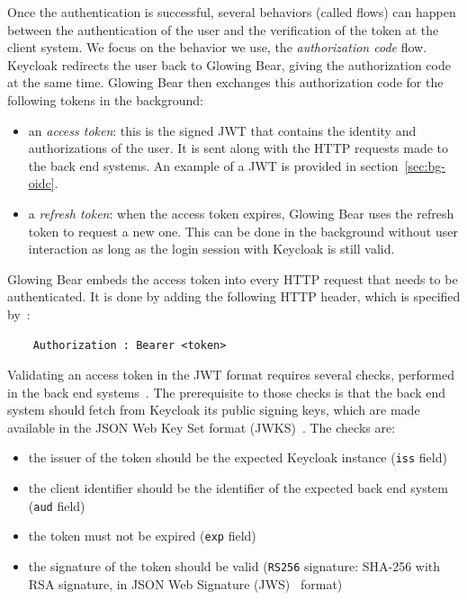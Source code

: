 Once the authentication is successful, several behaviors (called flows) can happen between the authentication of the user and the verification of the token at the client system.
We focus on the behavior we use, the \emph{authorization code} flow.
Keycloak redirects the user back to Glowing Bear, giving the authorization code at the same time.
Glowing Bear then exchanges this authorization code for the following tokens in the background:

\begin{itemize}
    \item an \emph{access token}: this is the signed JWT that contains the identity and authorizations of the user. It is sent along with the HTTP requests made to the back end systems. An example of a JWT is provided in section~\ref{sec:bg-oidc}.
    \item a \emph{refresh token}: when the access token expires, Glowing Bear uses the refresh token to request a new one. This can be done in the background without user interaction as long as the login session with Keycloak is still valid.
\end{itemize}

Glowing Bear embeds the access token into every HTTP request that needs to be authenticated.
It is done by adding the following HTTP header, which is specified by~\cite{rfc:bearertoken}:
\begin{verbatim}
    Authorization : Bearer <token>
\end{verbatim}

Validating an access token in the JWT format requires several checks, performed in the back end systems~\cite{rfc:oidc}.
The prerequisite to those checks is that the back end system should fetch from Keycloak its public signing keys, which are made available in the JSON Web Key Set format (JWKS)~\cite{rfc:jwk}.
The checks are:

\begin{itemize}
    \item the issuer of the token should be the expected Keycloak instance (\verb|iss| field)
    \item the client identifier should be the identifier of the expected back end system (\verb|aud| field)
    \item the token must not be expired (\verb|exp| field)
    \item the signature of the token should be valid (\verb|RS256| signature: SHA-256 with RSA signature, in JSON Web Signature (JWS)~\cite{rfc:jws} format)
\end{itemize}

